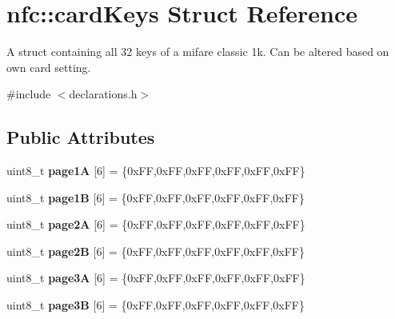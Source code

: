 \hypertarget{structnfc_1_1cardKeys}{}\section{nfc\+:\+:card\+Keys Struct Reference}
\label{structnfc_1_1cardKeys}


A struct containing all 32 keys of a mifare classic 1k. Can be altered based on own card setting.  




{\ttfamily \#include $<$declarations.\+h$>$}

\subsection*{Public Attributes}
\begin{DoxyCompactItemize}
\item 
\mbox{\label{structnfc_1_1cardKeys_ab376206a392996faae9116d3c7549f53}} 
uint8\+\_\+t {\bfseries page1A} \mbox{[}6\mbox{]} = \{0x\+F\+F,0x\+F\+F,0x\+F\+F,0x\+F\+F,0x\+F\+F,0x\+F\+F\}
\item 
\mbox{\label{structnfc_1_1cardKeys_a1fc619141da1153fb194cb00824051c3}} 
uint8\+\_\+t {\bfseries page1B} \mbox{[}6\mbox{]} = \{0x\+F\+F,0x\+F\+F,0x\+F\+F,0x\+F\+F,0x\+F\+F,0x\+F\+F\}
\item 
\mbox{\label{structnfc_1_1cardKeys_a4c560becddd2c92ab8f76bff1dc748ba}} 
uint8\+\_\+t {\bfseries page2A} \mbox{[}6\mbox{]} = \{0x\+F\+F,0x\+F\+F,0x\+F\+F,0x\+F\+F,0x\+F\+F,0x\+F\+F\}
\item 
\mbox{\label{structnfc_1_1cardKeys_a63efd593534b12ee9bb316e30fd4039f}} 
uint8\+\_\+t {\bfseries page2B} \mbox{[}6\mbox{]} = \{0x\+F\+F,0x\+F\+F,0x\+F\+F,0x\+F\+F,0x\+F\+F,0x\+F\+F\}
\item 
\mbox{\label{structnfc_1_1cardKeys_a2fbcf5fac822f07c3002246476b6ab3b}} 
uint8\+\_\+t {\bfseries page3A} \mbox{[}6\mbox{]} = \{0x\+F\+F,0x\+F\+F,0x\+F\+F,0x\+F\+F,0x\+F\+F,0x\+F\+F\}
\item 
\mbox{\label{structnfc_1_1cardKeys_a870cc98553687f5b4f64cf84984fa271}} 
uint8\+\_\+t {\bfseries page3B} \mbox{[}6\mbox{]} = \{0x\+F\+F,0x\+F\+F,0x\+F\+F,0x\+F\+F,0x\+F\+F,0x\+F\+F\}

\end{DoxyCompactItemize}
